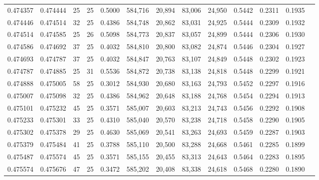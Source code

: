 \begin{tabular}{rrrrrrrrrrrrr}
0.474357 & 0.474444 &    25 &  25 &                                     0.5000 & 584,716 &  20,894 &  83,006 &  24,950 & 0.5442 & 0.2311 & 0.1935 \\
0.474446 & 0.474514 &    32 &  25 &                                     0.4386 & 584,748 &  20,862 &  83,031 &  24,925 & 0.5444 & 0.2309 & 0.1932 \\
0.474514 & 0.474585 &    25 &  26 &                                     0.5098 & 584,773 &  20,837 &  83,057 &  24,899 & 0.5444 & 0.2306 & 0.1930 \\
0.474586 & 0.474692 &    37 &  25 &                                     0.4032 & 584,810 &  20,800 &  83,082 &  24,874 & 0.5446 & 0.2304 & 0.1927 \\
0.474693 & 0.474787 &    37 &  25 &                                     0.4032 & 584,847 &  20,763 &  83,107 &  24,849 & 0.5448 & 0.2302 & 0.1923 \\
0.474787 & 0.474885 &    25 &  31 &                                     0.5536 & 584,872 &  20,738 &  83,138 &  24,818 & 0.5448 & 0.2299 & 0.1921 \\
0.474888 & 0.475005 &    58 &  25 &                                     0.3012 & 584,930 &  20,680 &  83,163 &  24,793 & 0.5452 & 0.2297 & 0.1916 \\
0.475007 & 0.475098 &    32 &  25 &                                     0.4386 & 584,962 &  20,648 &  83,188 &  24,768 & 0.5454 & 0.2294 & 0.1913 \\
0.475101 & 0.475232 &    45 &  25 &                                     0.3571 & 585,007 &  20,603 &  83,213 &  24,743 & 0.5456 & 0.2292 & 0.1908 \\
0.475233 & 0.475301 &    33 &  25 &                                     0.4310 & 585,040 &  20,570 &  83,238 &  24,718 & 0.5458 & 0.2290 & 0.1905 \\
0.475302 & 0.475378 &    29 &  25 &                                     0.4630 & 585,069 &  20,541 &  83,263 &  24,693 & 0.5459 & 0.2287 & 0.1903 \\
0.475379 & 0.475484 &    41 &  25 &                                     0.3788 & 585,110 &  20,500 &  83,288 &  24,668 & 0.5461 & 0.2285 & 0.1899 \\
0.475487 & 0.475574 &    45 &  25 &                                     0.3571 & 585,155 &  20,455 &  83,313 &  24,643 & 0.5464 & 0.2283 & 0.1895 \\
0.475574 & 0.475676 &    47 &  25 &                                     0.3472 & 585,202 &  20,408 &  83,338 &  24,618 & 0.5468 & 0.2280 & 0.1890 \\

\end{tabular}
